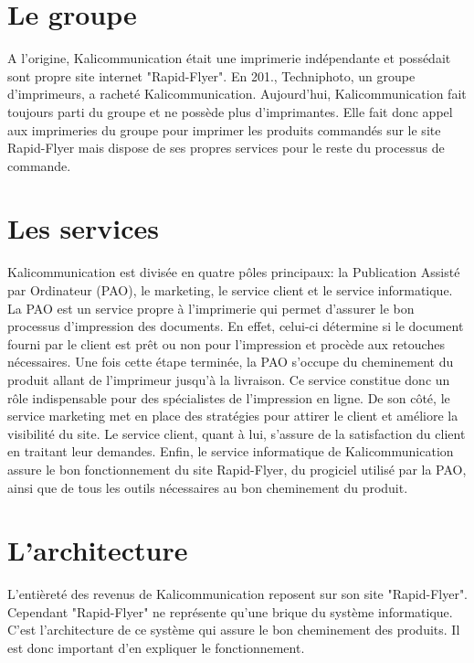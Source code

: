 
\section{Le groupe}
A l'origine, Kalicommunication était une imprimerie indépendante et possédait sont propre site internet "Rapid-Flyer".\newline
En 201., Techniphoto, un groupe d'imprimeurs, a racheté Kalicommunication. Aujourd'hui, Kalicommunication fait toujours parti du groupe et ne possède plus d'imprimantes. Elle fait donc appel aux imprimeries du groupe pour imprimer les produits commandés sur le site Rapid-Flyer mais dispose de ses propres services pour le reste du processus de commande.

\section{Les services}
Kalicommunication est divisée en quatre pôles principaux: la Publication Assisté par Ordinateur (PAO), le marketing, le service client et le service informatique.\newline
La PAO est un service propre à l'imprimerie qui permet d'assurer le bon processus d'impression des documents. En effet, celui-ci détermine si le document fourni par le client est prêt ou non pour l'impression et procède aux retouches nécessaires. Une fois cette étape terminée, la PAO s'occupe du cheminement du produit allant de l'imprimeur jusqu'à la livraison. Ce service constitue donc un rôle indispensable pour des spécialistes de l'impression en ligne.\newline
De son côté, le service marketing met en place des stratégies pour attirer le client et améliore la visibilité du site.
Le service client, quant à lui, s'assure de la satisfaction du client en traitant leur demandes.\newline
Enfin, le service informatique de Kalicommunication assure le bon fonctionnement du site Rapid-Flyer, du progiciel utilisé par la PAO, ainsi que de tous les outils nécessaires au bon cheminement du produit.

\section{L'architecture}
L'entièreté des revenus de Kalicommunication reposent sur son site "Rapid-Flyer". Cependant "Rapid-Flyer" ne représente qu'une brique du système informatique. C'est l'architecture de ce système qui assure le bon cheminement des produits. Il est donc important d'en expliquer le fonctionnement.

